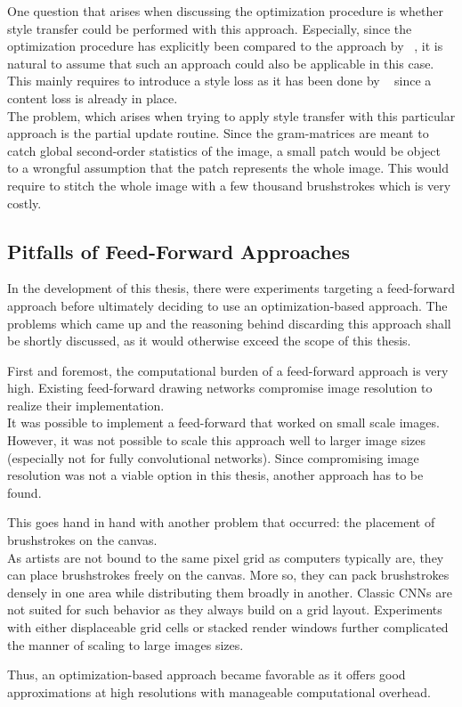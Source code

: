 One question that arises when discussing the optimization procedure is whether style transfer could be performed with this approach.
Especially, since the optimization procedure has explicitly been compared to the approach by \citeauthor*{gatys}~\cite{gatys}, it is natural to assume that such an approach could also be applicable in this case.\\
This mainly requires to introduce a style loss as it has been done by \citeauthor*{gatys}~\cite{gatys} since a content loss is already in place.\\
The problem, which arises when trying to apply style transfer with this particular approach is the partial update routine.
Since the gram-matrices are meant to catch global second-order statistics of the image, a small patch would be object to a wrongful assumption that the patch represents the whole image.
This would require to stitch the whole image with a few thousand brushstrokes which is very costly.

\subsection{Pitfalls of Feed-Forward Approaches}
In the development of this thesis, there were experiments targeting a feed-forward approach before ultimately deciding to use an optimization-based approach.
The problems which came up and the reasoning behind discarding this approach shall be shortly discussed, as it would otherwise exceed the scope of this thesis.

First and foremost, the computational burden of a feed-forward approach is very high.
Existing feed-forward drawing networks compromise image resolution to realize their implementation.\\
It was possible to implement a feed-forward that worked on small scale images. 
However, it was not possible to scale this approach well to larger image sizes (especially not for fully convolutional networks).
Since compromising image resolution was not a viable option in this thesis, another approach has to be found.

This goes hand in hand with another problem that occurred: the placement of brushstrokes on the canvas.\\
As artists are not bound to the same pixel grid as computers typically are, they can place brushstrokes freely on the canvas.
More so, they can pack brushstrokes densely in one area while distributing them broadly in another.
Classic CNNs are not suited for such behavior as they always build on a grid layout.
Experiments with either displaceable grid cells or stacked render windows further complicated the manner of scaling to large images sizes.

Thus, an optimization-based approach became favorable as it offers good approximations at high resolutions with manageable computational overhead.


